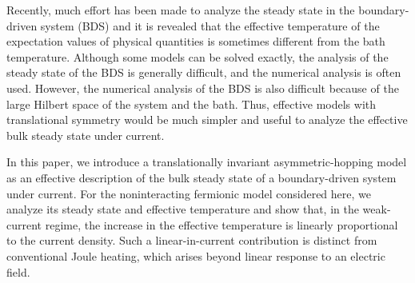 \documentclass[a4paper, amsfonts, amssymb, amsmath, reprint, showkeys, nofootinbib, twoside,superscriptaddress, prb]{revtex4-2}
\begin{document}
Recently, much effort has been made to analyze the steady state in the boundary-driven system (BDS)\cite{Wichterich2007-mg, Prosen2008-bm, Prosen2011-wp, Prosen2014-xx, Landi2022-gk} and it is revealed that the effective temperature of the expectation values of physical quantities is sometimes different from the bath temperature\cite{Landi2022-gk}. Although some models can be solved exactly, the analysis of the steady state of the BDS is generally difficult, and the numerical analysis is often used. However, the numerical analysis of the BDS is also difficult because of the large Hilbert space of the system and the bath. Thus, effective models with translational symmetry would be much simpler and useful to analyze the effective bulk steady state under current.

In this paper, we introduce a translationally invariant asymmetric-hopping model as an effective description of the bulk steady state of a boundary-driven system under current. For the noninteracting fermionic model considered here, we analyze its steady state and effective temperature and show that, in the weak-current regime, the increase in the effective temperature is linearly proportional to the current density. Such a linear-in-current contribution is distinct from conventional Joule heating, which arises beyond linear response to an electric field.
\end{document}
